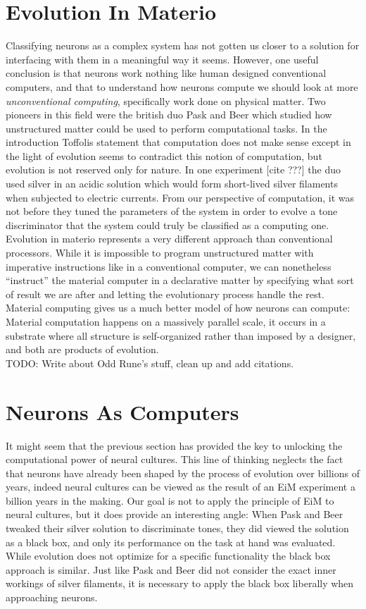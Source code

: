\section{Evolution In Materio}
Classifying neurons as a complex system has not gotten us closer to a solution
for interfacing with them in a meaningful way it seems.
However, one useful conclusion is that neurons work nothing like human designed
conventional computers, and that to understand how neurons compute we should
look at more \emph{unconventional computing}, specifically work done on physical
matter.
Two pioneers in this field were the british duo Pask and Beer which studied how
unstructured matter could be used to perform computational tasks.
In the introduction Toffolis statement that computation does not make sense
except in the light of evolution seems to contradict this notion of computation,
but evolution is not reserved only for nature.
In one experiment [cite ???] the duo used silver in an acidic solution which would form
short-lived silver filaments when subjected to electric currents.
From our perspective of computation, it was not before they tuned the parameters
of the system in order to evolve a tone discriminator that the system could
truly be classified as a computing one.
Evolution in materio represents a very different approach than conventional
processors.
While it is impossible to program unstructured matter with imperative
instructions like in a conventional computer, we can nonetheless ``instruct''
the material computer in a declarative matter by specifying what sort of result
we are after and letting the evolutionary process handle the rest.
Material computing gives us a much better model of how neurons can compute:
Material computation happens on a massively parallel scale, it occurs in a
substrate where all structure is self-organized rather than imposed by a
designer, and both are products of evolution.\\

TODO: Write about Odd Rune's stuff, clean up and add citations.

\section{Neurons As Computers}
It might seem that the previous section has provided the key to unlocking the
computational power of neural cultures.
This line of thinking neglects the fact that neurons have already been shaped by
the process of evolution over billions of years, indeed neural cultures can be
viewed as the result of an EiM experiment a billion years in the making.
Our goal is not to apply the principle of EiM to neural cultures, but it does
provide an interesting angle:
When Pask and Beer tweaked their silver solution to discriminate tones, they did
viewed the solution as a black box, and only its performance on the task at hand
was evaluated.
While evolution does not optimize for a specific functionality the black box
approach is similar.
Just like Pask and Beer did not consider the exact inner workings of silver
filaments, it is necessary to apply the black box liberally when approaching
neurons.

